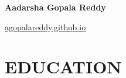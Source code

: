 \documentclass[10pt, letterpaper]{article}
\begin{document}
\begin{header}
    \begin{minipage}[t]{0.65\textwidth}
        \fontsize{20pt}{20pt}\selectfont \textbf{Aadarsha Gopala Reddy}\\
        \normalsize
        \mbox{}%
        \kern {}%
        \AND%
        \kern {}%
        \mbox{}%
    \end{minipage}
    \hfill %
    \begin{minipage}[t]{0.15\textwidth}
        \raggedleft %
        \href{https://agopalareddy.github.io}{agopalareddy.github.io}
    \end{minipage}
    \hfill %
    \begin{minipage}[t]{0.11\textwidth}
        \raggedleft %
    \end{minipage}
\end{header}

\vspace{\headerSpacing} %

\section{EDUCATION}
\end{document}
